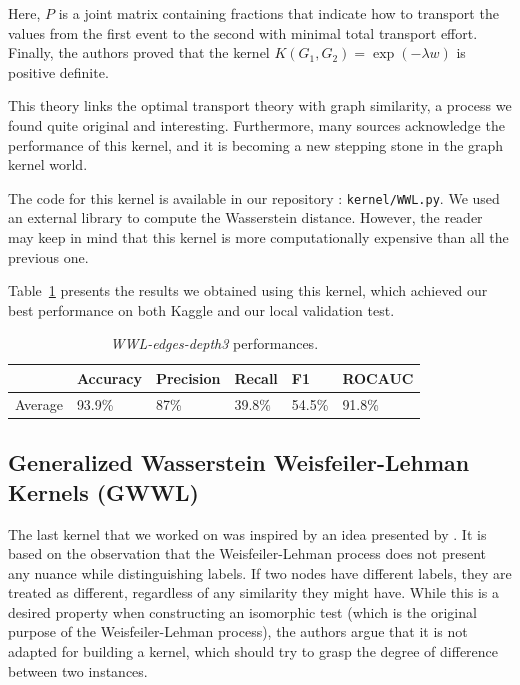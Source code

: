 \documentclass{IEEEtran}
\begin{document}
Here, $P$ is a joint matrix containing fractions that indicate how to transport the values from the first event to the second with minimal total transport effort.
Finally, the authors proved that the kernel $K(G_1,G_2) = \exp(-\lambda w)$ is positive definite.

This theory links the optimal transport theory with graph similarity, a process we found quite original and interesting. Furthermore, many sources acknowledge the performance of this kernel, and it is becoming a new stepping stone in the graph kernel world.

The code for this kernel is available in our repository : \texttt{kernel/WWL.py}.
We used an external library to compute the Wasserstein distance.
However, the reader may keep in mind that this kernel is more
computationally expensive than all the previous one.

Table~\ref{tab:wwl} presents the results we obtained using this kernel, which achieved our best performance on both Kaggle and our local validation test.

\begin{table}[h]
    \centering
    \begin{tabular}{l|llll|l}
                & Accuracy & Precision & Recall & F1     & ROCAUC \\
        \hline
        Average & 93.9\%   & 87\%      & 39.8\% & 54.5\% & 91.8\% \\
    \end{tabular}
    \caption{\emph{WWL-edges-depth3} performances.}
    \label{tab:wwl}
\end{table}

\subsection{Generalized Wasserstein Weisfeiler-Lehman Kernels (GWWL)}

The last kernel that we worked on was inspired by an idea presented by \cite{schulz2022generalized}. It is based on the observation that the Weisfeiler-Lehman process does not present any nuance while distinguishing labels. If two nodes have different labels, they are treated as different, regardless of any similarity they might have. While this is a desired property when constructing an isomorphic test (which is the original purpose of the Weisfeiler-Lehman process), the authors argue that it is not adapted for building a kernel, which should try to grasp the degree of difference between two instances.
\end{document}
